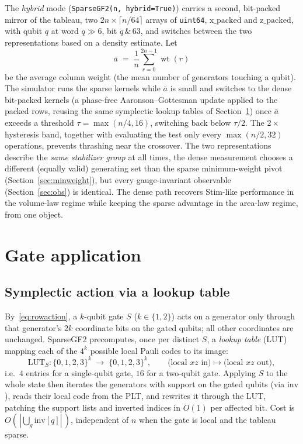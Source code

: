 \documentclass[11pt]{article}
\theoremstyle{definition}
\theoremstyle{plain}
\newcommand{\wt}{\operatorname{wt}}
\newcommand{\code}{\textsf{\small SparseGF2}}
\begin{document}
The \emph{hybrid} mode (\texttt{SparseGF2(n, hybrid=True)}) carries a second,
bit-packed mirror of the tableau, two $2n\times\lceil n/64\rceil$ arrays of
\texttt{uint64}, $\mathrm{x\_packed}$ and $\mathrm{z\_packed}$, with qubit $q$ at
word $q\gg 6$, bit $q\,\&\,63$, and switches between the two representations
based on a density estimate. Let
\[
  \bar a \;=\; \frac1n\sum_{r=0}^{2n-1}\wt(r)
\]
be the average column weight (the mean number of generators touching a qubit).
The simulator runs the sparse kernels while $\bar a$ is small and switches to the
dense bit-packed kernels (a phase-free Aaronson--Gottesman update applied to the
packed rows, reusing the same symplectic lookup tables of
Section~\ref{sec:gate}) once $\bar a$ exceeds a threshold $\tau=\max(n/4,16)$,
switching back below $\tau/2$. The $2\times$ hysteresis band, together with
evaluating the test only every $\max(n/2,32)$ operations, prevents thrashing near
the crossover. The two representations describe the \emph{same stabilizer group}
at all times, the dense measurement chooses a different (equally valid)
generating set than the sparse minimum-weight pivot
(Section~\ref{sec:minweight}), but every gauge-invariant observable
(Section~\ref{sec:obs}) is identical. The dense path recovers Stim-like
performance in the volume-law regime while keeping the sparse advantage in the
area-law regime, from one object.

\section{Gate application}
\label{sec:gate}
\label{sec:gates}

\subsection{Symplectic action via a lookup table}
By~\eqref{eq:rowaction}, a $k$-qubit gate $S$ ($k\in\{1,2\}$) acts on a
generator only through that generator's $2k$ coordinate bits on the gated
qubits; all other coordinates are unchanged. \code{} precomputes, once per
distinct $S$, a \emph{lookup table} (LUT) mapping each of the $4^k$ possible
local Pauli codes to its image:
\begin{equation}
  \mathrm{LUT}_S\colon \{0,1,2,3\}^{k}\;\longrightarrow\;\{0,1,2,3\}^{k},
  \qquad
  \text{(local }xz\text{ in)} \mapsto \text{(local }xz\text{ out)} ,
\end{equation}
i.e.\ $4$ entries for a single-qubit gate, $16$ for a two-qubit gate. Applying
$S$ to the whole state then iterates the generators with support on the gated
qubits (via $\mathrm{inv}$), reads their local code from the PLT, and rewrites
it through the LUT, patching the support lists and inverted indices in $O(1)$
per affected bit. Cost is $O(\,|{\bigcup_q \mathrm{inv}[q]}|\,)$, independent
of $n$ when the gate is local and the tableau sparse.
\end{document}
